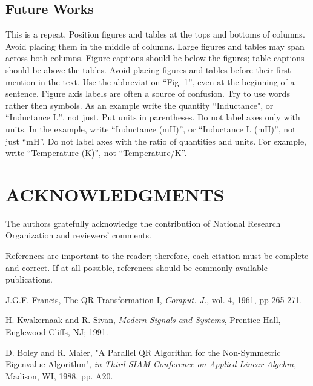 \documentclass[a4paper, 10pt, conference]{ieeeconf}      %
\begin{document}
\subsection{Future Works}

This is a repeat.
Position figures and tables at the tops and bottoms of columns.
Avoid placing them in the middle of columns. Large figures and tables
may span across both columns. Figure captions should be below the figures;
 table captions should be above the tables. Avoid placing figures and tables
  before their first mention in the text. Use the abbreviation ``Fig. 1'',
  even at the beginning of a sentence.
Figure axis labels are often a source of confusion.
Try to use words rather then symbols. As an example write the quantity ``Inductance",
 or ``Inductance L'', not just.
 Put units in parentheses. Do not label axes only with units.
 In the example, write ``Inductance (mH)'', or ``Inductance L (mH)'', not just ``mH''.
 Do not label axes with the ratio of quantities and units.
 For example, write ``Temperature (K)'', not ``Temperature/K''.

\section{ACKNOWLEDGMENTS}

The authors gratefully acknowledge the contribution of National Research Organization and reviewers' comments.



References are important to the reader; therefore, each citation must be complete and correct. If at all possible, references should be commonly available publications.

\begin{thebibliography}{99}

J.G.F. Francis, The QR Transformation I, {\it Comput. J.}, vol. 4, 1961, pp 265-271.

H. Kwakernaak and R. Sivan, {\it Modern Signals and Systems}, Prentice Hall, Englewood Cliffs, NJ; 1991.

D. Boley and R. Maier, "A Parallel QR Algorithm for the Non-Symmetric Eigenvalue Algorithm", {\it in Third SIAM Conference on Applied Linear Algebra}, Madison, WI, 1988, pp. A20.

\end{thebibliography}
\end{document}
